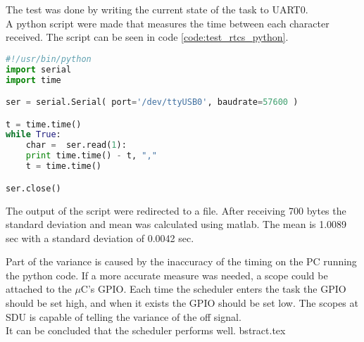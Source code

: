 The test was done by writing the current state of the task to UART0.\\ A python script were made that measures the time between each character received. The script can be seen in code \ref{code:test_rtcs_python}.
\begin{lstlisting}[language = python, caption = Python code used to measure time between received byte, label=code:test_rtcs_python]
#!/usr/bin/python
import serial
import time

ser = serial.Serial( port='/dev/ttyUSB0', baudrate=57600 )

t = time.time()
while True:
    char =  ser.read(1):
    print time.time() - t, ","
    t = time.time()

ser.close()
\end{lstlisting}
The output of the script were redirected to a file. After receiving 700 bytes the standard deviation and mean was calculated using matlab.
The mean is 1.0089 sec with a standard deviation of 0.0042 sec.

Part of the variance is caused by the inaccuracy of the timing on the PC running the python code. If a more accurate measure was needed, a scope could be attached to the $\mu$C's GPIO. Each time the scheduler enters the task the GPIO should be set high, and when it exists the GPIO should be set low. The scopes at SDU is capable of telling the variance of the off signal. \\
It can be concluded that the scheduler performs well.
bstract.tex
